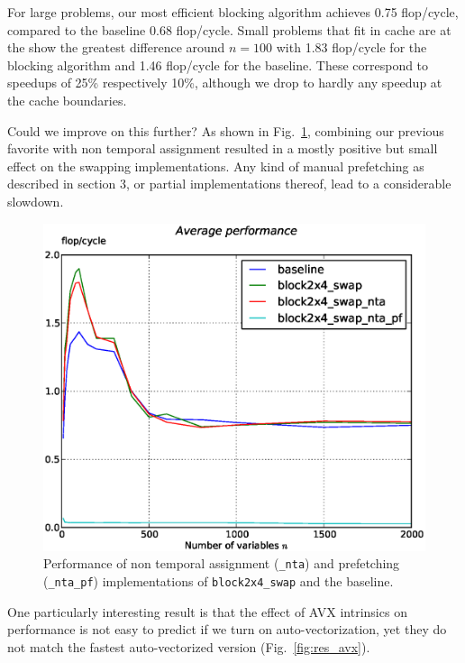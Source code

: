 \documentclass[letterpaper]{article}
\begin{document}
For large problems, our most efficient blocking algorithm achieves 0.75 flop/cycle, compared to the baseline 0.68 flop/cycle.
Small problems that fit in cache are at the show the greatest difference around $n=100$ with 1.83 flop/cycle for the blocking algorithm and 1.46 flop/cycle for the baseline.
These correspond to speedups of 25\% respectively 10\%, although we drop to hardly any speedup at the cache boundaries.

Could we improve on this further?
As shown in Fig.~\ref{fig:res_cachecontrol}, combining our previous favorite with non temporal assignment resulted in a mostly positive but small effect on the swapping implementations.
Any kind of manual prefetching as described in section 3, or partial implementations thereof, lead to a considerable slowdown.

\begin{figure}\centering
  \includegraphics[scale=0.4]{img/results_cachecontrol_novec.eps}
  \caption{Performance of non temporal assignment ({\tt \_nta}) and prefetching ({\tt \_nta\_pf}) implementations of {\tt block2x4\_swap} and the baseline.\label{fig:res_cachecontrol}}
\end{figure}

One particularly interesting result is that the effect of AVX intrinsics on performance is not easy to predict if we turn on auto-vectorization,
yet they do not match the fastest auto-vectorized version (Fig.~\ref{fig:res_avx}).
\end{document}
